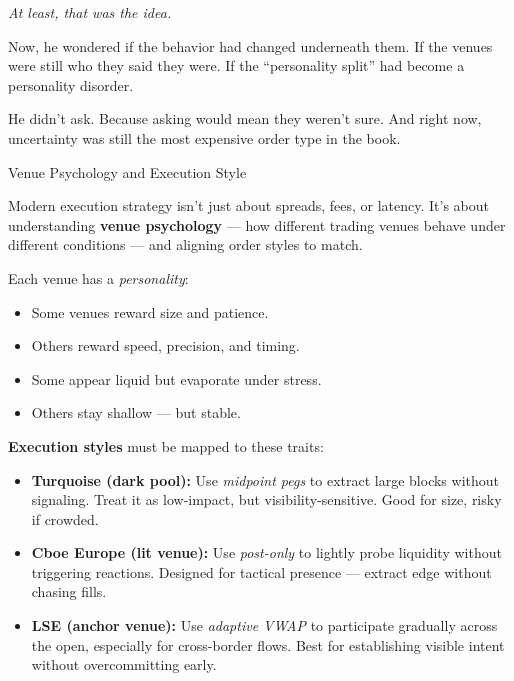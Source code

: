 \textit{At least, that was the idea.}

Now, he wondered if the behavior had changed underneath them.
If the venues were still who they said they were.
If the ``personality split'' had become a personality disorder.

He didn’t ask.
Because asking would mean they weren’t sure.
And right now, uncertainty was still the most expensive order type in the book.

  


\begin{TechnicalSidebar}{Venue Psychology and Execution Style}

  Modern execution strategy isn't just about spreads, fees, or latency.  
  It's about understanding \textbf{venue psychology} — how different trading venues behave under different conditions — and aligning order styles to match.

  \medskip

  Each venue has a \textit{personality}:
  \begin{itemize}
    \item Some venues reward size and patience.
    \item Others reward speed, precision, and timing.
    \item Some appear liquid but evaporate under stress.
    \item Others stay shallow — but stable.
  \end{itemize}

  \medskip

  \textbf{Execution styles} must be mapped to these traits:

  \begin{itemize}
    \item \textbf{Turquoise (dark pool):} 
    Use \textit{midpoint pegs} to extract large blocks without signaling.  
    Treat it as low-impact, but visibility-sensitive. Good for size, risky if crowded.

    \item \textbf{Cboe Europe (lit venue):} 
    Use \textit{post-only} to lightly probe liquidity without triggering reactions.  
    Designed for tactical presence — extract edge without chasing fills.

    \item \textbf{LSE (anchor venue):} 
    Use \textit{adaptive VWAP} to participate gradually across the open, especially for cross-border flows.  
    Best for establishing visible intent without overcommitting early.


\end{itemize}
\end{TechnicalSidebar}
